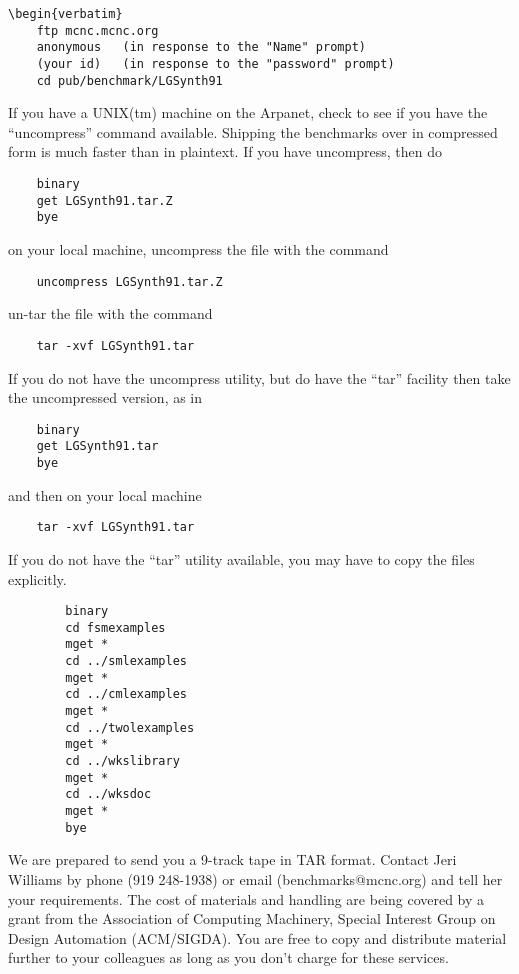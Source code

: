 {\begin{pespace}
\begin{verbatim}
\begin{verbatim}
	ftp mcnc.mcnc.org
	anonymous 	(in response to the "Name" prompt)
	(your id) 	(in response to the "password" prompt)
	cd pub/benchmark/LGSynth91
\end{verbatim}


If you have a UNIX(tm) machine on the Arpanet,
check to see if you have the ``uncompress'' command
available. Shipping the benchmarks over in compressed
form is much faster than in plaintext. If you have
uncompress, then do

\begin{verbatim}
	binary
	get LGSynth91.tar.Z
	bye
\end{verbatim}

on your local machine, uncompress the file with the command

\begin{verbatim}
	uncompress LGSynth91.tar.Z
\end{verbatim}

un-tar the file with the command

\begin{verbatim}
	tar -xvf LGSynth91.tar
\end{verbatim}

If you do not have the uncompress utility, but do have
the ``tar'' facility then take the uncompressed version, as in

\begin{verbatim}
	binary
	get LGSynth91.tar
	bye
\end{verbatim}

and then on your local machine

\begin{verbatim}
	tar -xvf LGSynth91.tar
\end{verbatim}


If you do not have the ``tar'' utility available, you may have
to copy the files explicitly. 

\begin{verbatim}
        binary
        cd fsmexamples              
        mget *
        cd ../smlexamples
        mget *
        cd ../cmlexamples
        mget *
        cd ../twolexamples
        mget *
        cd ../wkslibrary
        mget *
        cd ../wksdoc
        mget *
        bye
\end{verbatim}


\item   We are prepared to send you a 9-track tape in TAR format.  
        Contact Jeri Williams by phone (919 248-1938) or email
        (benchmarks@mcnc.org) and tell her your requirements.
        The cost of materials and handling are being covered by a
        grant from the Association of Computing Machinery, Special
        Interest Group on Design Automation (ACM/SIGDA). You are
        free to copy and distribute material further to your colleagues
        as long as you don't charge for these services.



\end{pespace}}
